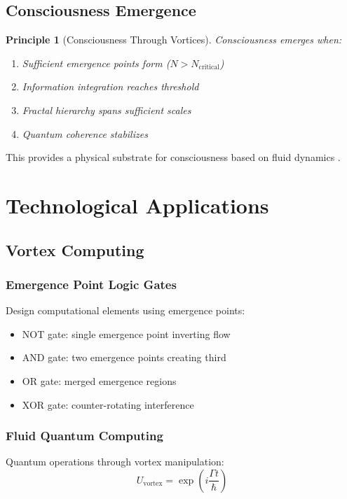 \documentclass[12pt]{article}
\newtheorem{principle}[theorem]{Principle}
\begin{document}
\subsection{Consciousness Emergence}

\begin{principle}[Consciousness Through Vortices]
Consciousness emerges when:
\begin{enumerate}
\item Sufficient emergence points form ($N > N_{\text{critical}}$)
\item Information integration reaches threshold
\item Fractal hierarchy spans sufficient scales
\item Quantum coherence stabilizes
\end{enumerate}
\end{principle}

This provides a physical substrate for consciousness based on fluid dynamics \cite{tononi2016,koch2016}.

\section{Technological Applications}

\subsection{Vortex Computing}

\subsubsection{Emergence Point Logic Gates}

Design computational elements using emergence points:
\begin{itemize}
\item NOT gate: single emergence point inverting flow
\item AND gate: two emergence points creating third
\item OR gate: merged emergence regions
\item XOR gate: counter-rotating interference
\end{itemize}

\subsubsection{Fluid Quantum Computing}

Quantum operations through vortex manipulation:
\begin{equation}
U_{\text{vortex}} = \exp\left(i\frac{\Gamma t}{\hbar}\right)
\end{equation}
\end{document}
